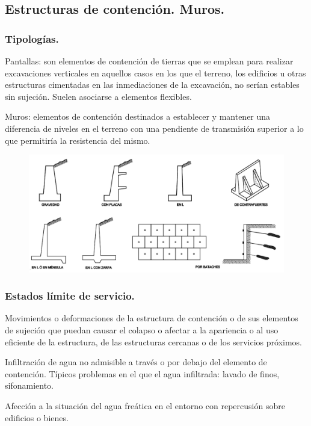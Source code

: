 \subsection{Estructuras de contención. Muros.}
\subsubsection{Tipologías.}
Pantallas: son elementos de contención de tierras que se emplean para realizar excavaciones verticales en aquellos casos en los que el terreno, los edificios u otras estructuras cimentadas en las inmediaciones de la excavación, no serían estables sin sujeción. Suelen asociarse a elementos flexibles.

Muros: elementos de contención destinados a establecer y mantener una diferencia de niveles en el terreno con una pendiente de transmisión superior a lo que permitiría la resistencia del mismo.

\begin{figure}[H]
    \centering
    \includegraphics[width = 1 \linewidth]{Imagenes/Estructuras de contencion - Muros.png}
\end{figure}

\subsubsection{Estados límite de servicio.}
Movimientos o deformaciones de la estructura de contención o de sus elementos de sujeción que puedan causar el colapso o afectar a la apariencia o al uso eficiente de la estructura, de las estructuras cercanas o de los servicios próximos.

Infiltración de agua no admisible a través o por debajo del elemento de contención. Típicos problemas en el que el agua infiltrada: lavado de finos, sifonamiento.

Afección a la situación del agua freática en el entorno con repercusión sobre edificios o bienes.

